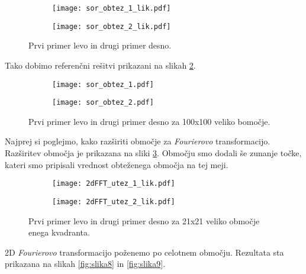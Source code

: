 \documentclass[12pt,a4paper]{article}
\begin{document}
\begin{figure}[H]
    \centering
    \begin{subfigure}[b]{0.45\textwidth}  			
        \texttt{[image: sor\_obtez\_1\_lik.pdf]}
    \end{subfigure}
    \begin{subfigure}[b]{0.45\textwidth}  			
        \texttt{[image: sor\_obtez\_2\_lik.pdf]}     
    \end{subfigure}
    \caption{Prvi primer levo in drugi primer desno.} \label{fig:slika5}
\end{figure}

\noindent Tako dobimo referenčni rešitvi prikazani na slikah \ref{fig:slika6}.
\begin{figure}[H]
    \centering
    \begin{subfigure}[b]{0.45\textwidth}  			
        \texttt{[image: sor\_obtez\_1.pdf]}
    \end{subfigure}
    \begin{subfigure}[b]{0.45\textwidth}  			
        \texttt{[image: sor\_obtez\_2.pdf]}     
    \end{subfigure}
    \caption{Prvi primer levo in drugi primer desno za 100x100 veliko bomočje.} \label{fig:slika6}
\end{figure}

Najprej si poglejmo, kako razširiti območje za \textit{Fourierovo} transformacijo. Razširitev območja je prikazana na sliki \ref{fig:slika7}. Območju smo dodali še zunanje točke, kateri smo pripisali vrednost obteženega območja na tej meji.

\begin{figure}[H]
    \centering
    \begin{subfigure}[b]{0.45\textwidth}  			
        \texttt{[image: 2dFFT\_utez\_1\_lik.pdf]}
    \end{subfigure}
    \begin{subfigure}[b]{0.45\textwidth}  			
        \texttt{[image: 2dFFT\_utez\_2\_lik.pdf]}     
    \end{subfigure}
    \caption{Prvi primer levo in drugi primer desno za 21x21 veliko območje enega kvadranta.} \label{fig:slika7}
\end{figure}

\noindent 2D \textit{Fourierovo} transformacijo poženemo po celotnem območju. Rezultata sta prikazana na slikah \ref{fig:slika8} in \ref{fig:slika9}.
\end{document}
